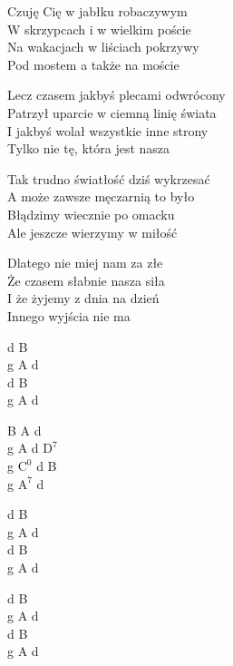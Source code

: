 \begin{text}
    Czuję Cię w jabłku robaczywym\\
    W skrzypcach i w wielkim poście\\
    Na wakacjach w liściach pokrzywy\\
    Pod mostem a także na moście

    \vin Lecz czasem jakbyś plecami odwrócony\\
    \vin Patrzył uparcie w ciemną linię świata\\
    \vin I jakbyś wolał wszystkie inne strony\\
    \vin Tylko nie tę, która jest nasza

    Tak trudno światłość dziś wykrzesać\\
    A może zawsze męczarnią to było\\
    Błądzimy wiecznie po omacku\\
    Ale jeszcze wierzymy w miłość

    Dlatego nie miej nam za złe\\
    Że czasem słabnie nasza siła\\
    I że żyjemy z dnia na dzień\\
    Innego wyjścia nie ma
\end{text}
\begin{chord}
    d B\\
    g A d\\
    d B\\
    g A d

    B A d\\
    g A d $\mathrm{D^{7}}$\\
    g $\mathrm{C^{0}}$ d B\\
    g $\mathrm{A^{7}}$ d

    d B\\
    g A d\\
    d B\\
    g A d

    d B\\
    g A d\\
    d B\\
    g A d
\end{chord}
